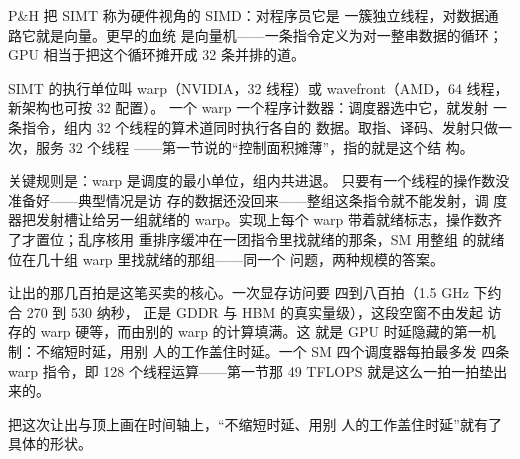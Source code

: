\begin{classicnote}
P\&H 把 SIMT 称为硬件视角的 SIMD：对程序员它是
一簇独立线程，对数据通路它就是向量。更早的血统
是向量机——一条指令定义为对一整串数据的循环；
GPU 相当于把这个循环摊开成 32 条并排的道。
\end{classicnote}

SIMT 的执行单位叫 warp（NVIDIA，32 线程）或
wavefront（AMD，64 线程，新架构也可按 32 配置）。
一个 warp 一个程序计数器：调度器选中它，就发射
一条指令，组内 32 个线程的算术道同时执行各自的
数据。取指、译码、发射只做一次，服务 32 个线程
——第一节说的“控制面积摊薄”，指的就是这个结
构。

关键规则是：warp 是调度的最小单位，组内共进退。
只要有一个线程的操作数没准备好——典型情况是访
存的数据还没回来——整组这条指令就不能发射，调
度器把发射槽让给另一组就绪的 warp。实现上每个
warp 带着就绪标志，操作数齐了才置位；乱序核用
重排序缓冲在一团指令里找就绪的那条，SM 用整组
的就绪位在几十组 warp 里找就绪的那组——同一个
问题，两种规模的答案。

让出的那几百拍是这笔买卖的核心。一次显存访问要
四到八百拍（1.5 GHz 下约合 270 到 530 纳秒，
正是 GDDR 与 HBM 的真实量级），这段空窗不由发起
访存的 warp 硬等，而由别的 warp 的计算填满。这
就是 GPU 时延隐藏的第一机制：不缩短时延，用别
人的工作盖住时延。一个 SM 四个调度器每拍最多发
四条 warp 指令，即 128 个线程运算——第一节那
49 TFLOPS 就是这么一拍一拍垫出来的。

把这次让出与顶上画在时间轴上，“不缩短时延、用别
人的工作盖住时延”就有了具体的形状。

